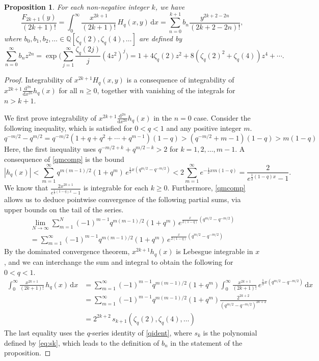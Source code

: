 \documentclass[a4paper]{article}
\theoremstyle{plain}
\newtheorem{proposition}[theorem]{Proposition}
\theoremstyle{definition}
\newcommand{\dd}{\mathrm{d}}
\renewcommand{\geq}{\geqslant}
\newcommand{\bq}{\mathbb{Q}}
\begin{document}
\begin{proposition} \label{F2k+1}
For each non-negative integer $k$, we have
\[
\frac{F_{2k+1}(y)}{(2k+1)!} = \int_0^\infty \!\! \frac{x^{2k+1}}{(2k+1)!} \, H_q(x,y) \, \dd x = \sum_{n=0}^{k+1} b_n \frac{y^{2k+2-2n}}{(2k+2-2n)!},
\]
where $b_0, b_1, b_2, \ldots \in \bq[\zeta_q(2), \zeta_q(4), \ldots]$ are defined by
\[
\sum_{n=0}^\infty b_nz^{2n} = \exp \bigg(\sum_{j=1}^\infty\frac{\zeta_q(2j)}{j} (4z^2)^j \bigg) = 1+4\zeta_q(2)z^2+8(\zeta_q(2)^2+\zeta_q(4))z^4 + \cdots.
\]
\end{proposition}


\begin{proof}
Integrability of $x^{2k+1}H_q(x,y)$ is a consequence of integrability of $x^{2k+1} \frac{\dd^{2n}}{\dd x^{2n}} h_q(x)$ for all $n \geq 0$, together with vanishing of the integrals for $n>k+1$.


We first prove integrability of $x^{2k+1} \frac{\dd^{2n}}{\dd x^{2n}} h_q(x)$ in the $n=0$ case. Consider the following inequality, which is satisfied for $0<q<1$ and any positive integer $m$.
\begin{equation} \label{qmcomp} 
q^{-m/2}-q^{m/2}=q^{-m/2}(1+q+q^2+ \cdots +q^{m-1})(1-q)> (q^{-m/2}+m-1)(1-q)>m(1-q)
\end{equation}
Here, the first inequality uses $q^{-m/2+k}+q^{m/2-k}>2$ for $k=1,2, \ldots, m-1$. A consequence of \cref{qmcomp} is the bound
\[
|h_q(x)| < \sum_{m=1}^\infty q^{m(m-1)/2}(1+q^m) \, e^{\frac{1}{2} x (q^{m/2}-q^{-m/2})} < 2\sum_{m=1}^\infty e^{-\frac{1}{2}xm(1-q)} = \frac{2}{e^{\frac{1}{2}(1-q)x}-1}.
\]
We know that $\frac{2x^{2k+1}}{e^{\frac{1}{2}(1-q)x}-1}$ is integrable for each $k\geq 0$. Furthermore, \cref{qmcomp} allows us to deduce pointwise convergence of the following partial sums, via upper bounds on the tail of the series.
\begin{multline*}
\lim_{N\to\infty} \sum_{m=1}^N (-1)^{m-1}q^{m(m-1)/2}(1+q^m) \, e^{\frac{x}{2(1-q)} (q^{m/2}-q^{-m/2})} \\
= \sum_{m=1}^\infty (-1)^{m-1}q^{m(m-1)/2}(1+q^m) \, e^{\frac{x}{2(1-q)} (q^{m/2}-q^{-m/2})}
\end{multline*}
By the dominated convergence theorem, $x^{2k+1}h_q(x)$ is Lebesgue integrable in $x$, and we can interchange the sum and integral to obtain the following for $0<q<1$.
\begin{align*} 
\int_0^\infty \!\! \frac{x^{2k+1}}{(2k+1)!} \, h_q(x) \, \dd x &= \sum_{m=1}^\infty (-1)^{m-1}q^{m(m-1)/2}(1+q^m) \int_0^\infty \!\! \frac{x^{2k+1}}{(2k+1)!} \, e^{\frac{1}{2}x (q^{m/2}-q^{-m/2})} \, \dd x \\
&=\sum_{m=1}^\infty (-1)^{m-1}q^{m(m-1)/2}(1+q^m)\frac{ 2^{2k+2}}{(q^{m/2}-q^{-m/2})^{2k+2}} \\
&=2^{2k+2} \, s_{k+1}\left(\zeta_q(2), \zeta_q(4), \ldots \right)
\end{align*} 
The last equality uses the $q$-series identity of \cref{qident}, where $s_k$ is the polynomial defined by \cref{eq:sk}, which leads to the definition of $b_n$ in the statement of the proposition.



\end{proof}
\end{document}
